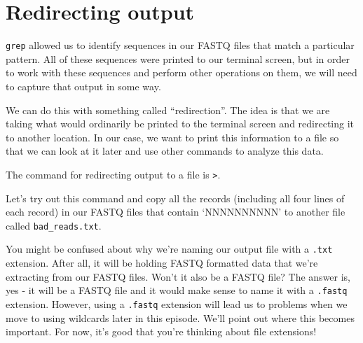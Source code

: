 \documentclass[
  letterpaper,
  DIV=11,
  numbers=noendperiod]{scrreprt}
\newenvironment{Shaded}{\begin{snugshade}}{\end{snugshade}}
\newcommand{\AttributeTok}[1]{\textcolor[rgb]{0.40,0.45,0.13}{#1}}
\newcommand{\ExtensionTok}[1]{\textcolor[rgb]{0.00,0.23,0.31}{#1}}
\newcommand{\NormalTok}[1]{\textcolor[rgb]{0.00,0.23,0.31}{#1}}
\newcommand{\OperatorTok}[1]{\textcolor[rgb]{0.37,0.37,0.37}{#1}}
\begin{document}
\section{Redirecting output}\label{redirecting-output}

\texttt{grep} allowed us to identify sequences in our FASTQ files that
match a particular pattern. All of these sequences were printed to our
terminal screen, but in order to work with these sequences and perform
other operations on them, we will need to capture that output in some
way.

We can do this with something called ``redirection''. The idea is that
we are taking what would ordinarily be printed to the terminal screen
and redirecting it to another location. In our case, we want to print
this information to a file so that we can look at it later and use other
commands to analyze this data.

The command for redirecting output to a file is \texttt{\textgreater{}}.

Let's try out this command and copy all the records (including all four
lines of each record) in our FASTQ files that contain `NNNNNNNNNN' to
another file called \texttt{bad\_reads.txt}.

\begin{Shaded}
\end{Shaded}

\begin{tcolorbox}[enhanced jigsaw, opacitybacktitle=0.6, colback=white, coltitle=black, opacityback=0, rightrule=.15mm, toptitle=1mm, toprule=.15mm, bottomtitle=1mm, colframe=quarto-callout-note-color-frame, arc=.35mm, titlerule=0mm, colbacktitle=quarto-callout-note-color!10!white, leftrule=.75mm, title=\textcolor{quarto-callout-note-color}{\faInfo}\hspace{0.5em}{File extensions}, breakable, bottomrule=.15mm, left=2mm]

You might be confused about why we're naming our output file with a
\texttt{.txt} extension. After all, it will be holding FASTQ formatted
data that we're extracting from our FASTQ files. Won't it also be a
FASTQ file? The answer is, yes - it will be a FASTQ file and it would
make sense to name it with a \texttt{.fastq} extension. However, using a
\texttt{.fastq} extension will lead us to problems when we move to using
wildcards later in this episode. We'll point out where this becomes
important. For now, it's good that you're thinking about file
extensions!

\end{tcolorbox}
\end{document}
